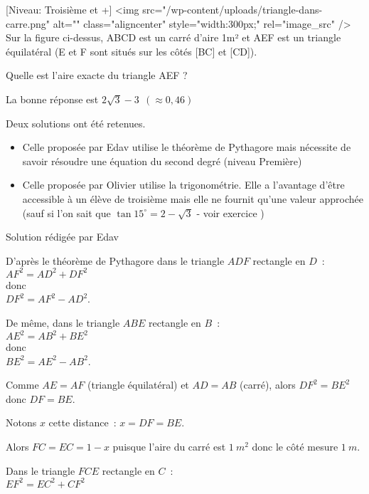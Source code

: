 
%
[Niveau: Troisième et +]
<img src="/wp-content/uploads/triangle-dans-carre.png" alt="" class="aligncenter" style="width:300px;" rel="image_src" />
Sur la figure ci-dessus, ABCD est un carré d'aire 1m² et AEF est un triangle équilatéral (E et F sont situés sur les côtés [BC] et [CD]).
\par
Quelle est l'aire exacte du triangle AEF ?
\begin{solution}
     \begin{note}
          La bonne réponse est $2 \sqrt{3}-3 \ \ ( \approx 0,46) $
          \par
          Deux solutions ont été retenues.
          \begin{itemize}
               \item
               Celle proposée par Edav utilise le théorème de Pythagore mais nécessite de savoir résoudre une équation du second degré (niveau Première)
               \item
               Celle proposée par Olivier utilise la trigonométrie. Elle a l'avantage d'être accessible à un élève de troisième mais elle ne fournit qu'une valeur approchée (sauf si l'on sait que $\tan 15^{\circ}=  2-\sqrt{3}$ - voir exercice )
          \end{itemize}
     \end{note}
     Solution rédigée par Edav
\begin{note}
  D'après le théorème de Pythagore dans le triangle $ ADF $ rectangle en $ D $~:
\\
$ AF^2 = AD^2 + DF^2 $
\\
donc
\\
$ DF^2 = AF^2 - AD^2 $.
\par
De même, dans le triangle $ ABE $ rectangle en $ B $~:
\\
$ AE^2 = AB^2 + BE^2 $
\\
donc
\\
$ BE^2 = AE^2 - AB^2 $.
\par
Comme $ AE = AF $ (triangle équilatéral) et $ AD = AB $ (carré), alors $ DF^2 = BE^2 $ donc $  DF = BE $.
\par
Notons $ x $ cette distance~: $ x = DF = BE $.
\par
Alors $ FC = EC = 1 - x $ puisque l'aire du carré est $ 1\ m^2 $ donc le côté mesure $ 1\ m. $
\par
Dans le triangle $ FCE $ rectangle en $ C$~:
\\
$ EF^2 = EC^2 + CF^2 $
\end{note}
\medskip
     \par



\end{solution}
